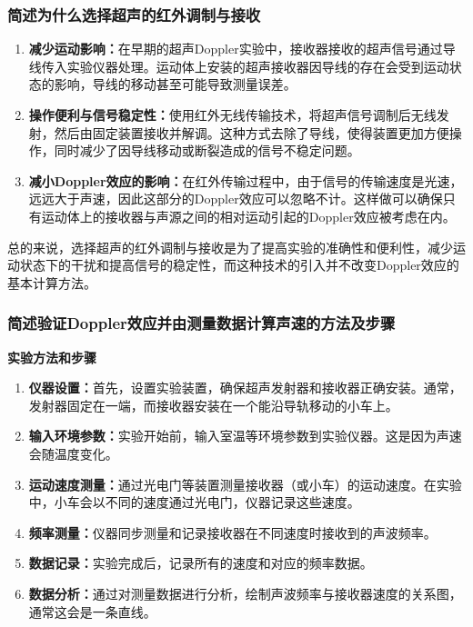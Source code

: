 \documentclass[dvipsnames, svgnames,a4paper,11pt]{article}
\begin{document}
	\subsubsection{简述为什么选择超声的红外调制与接收}
	\begin{enumerate}
		\item \textbf{减少运动影响：}在早期的超声Doppler实验中，接收器接收的超声信号通过导线传入实验仪器处理。运动体上安装的超声接收器因导线的存在会受到运动状态的影响，导线的移动甚至可能导致测量误差。
		
		\item \textbf{操作便利与信号稳定性：}使用红外无线传输技术，将超声信号调制后无线发射，然后由固定装置接收并解调。这种方式去除了导线，使得装置更加方便操作，同时减少了因导线移动或断裂造成的信号不稳定问题。
		
		\item \textbf{减小Doppler效应的影响：}在红外传输过程中，由于信号的传输速度是光速，远远大于声速，因此这部分的Doppler效应可以忽略不计。这样做可以确保只有运动体上的接收器与声源之间的相对运动引起的Doppler效应被考虑在内。
	\end{enumerate}
	
	总的来说，选择超声的红外调制与接收是为了提高实验的准确性和便利性，减少运动状态下的干扰和提高信号的稳定性，而这种技术的引入并不改变Doppler效应的基本计算方法。	
	
	\subsubsection{简述验证Doppler效应并由测量数据计算声速的方法及步骤}
	\textbf{实验方法和步骤}
	
	\begin{enumerate}
		\item \textbf{仪器设置：}首先，设置实验装置，确保超声发射器和接收器正确安装。通常，发射器固定在一端，而接收器安装在一个能沿导轨移动的小车上。
		
		\item \textbf{输入环境参数：}实验开始前，输入室温等环境参数到实验仪器。这是因为声速会随温度变化。
		
		\item \textbf{运动速度测量：}通过光电门等装置测量接收器（或小车）的运动速度。在实验中，小车会以不同的速度通过光电门，仪器记录这些速度。
		
		\item \textbf{频率测量：}仪器同步测量和记录接收器在不同速度时接收到的声波频率。
		
		\item \textbf{数据记录：}实验完成后，记录所有的速度和对应的频率数据。
		
		\item \textbf{数据分析：}通过对测量数据进行分析，绘制声波频率与接收器速度的关系图，通常这会是一条直线。
	\end{enumerate}
	
\end{document}
